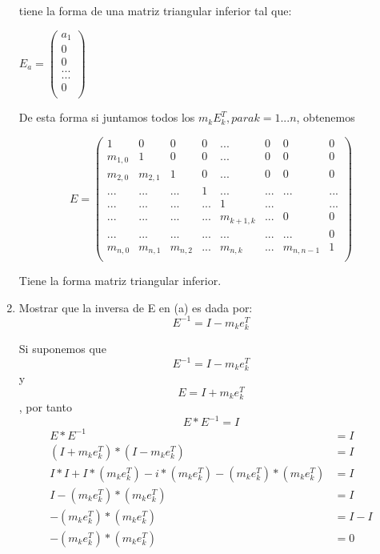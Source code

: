 \begin{enumerate}
        tiene la forma de una matriz triangular inferior tal que:
        
        \(
            E_{a} =
            \left( {\begin{array}{c}
                a_{1} \\
                0 \\
                0 \\
                ... \\
                ... \\
                0\\
            \end{array} } \right)
        \)
        
        De esta forma si juntamos todos los $m_{k}E_{k}^{T}, para k = 1 ... n$, obtenemos
    
        \[
        E =
            \left( {\begin{array}{cccccccc}
                1 & 0  & 0 & 0 & ... & 0 & 0 & 0\\
                m_{1,0} & 1  & 0 & 0 & ... & 0 & 0 & 0\\
                m_{2,0} & m_{2,1}  & 1 & 0 & ... & 0 & 0 & 0\\
                ... & ... & ... & 1 & ... & ... & ... & ...\\
                ... & ... & ... & ... & 1 & ... &  & ...\\
                ... & ...  & ... & ... & m_{k+1,k} & ... & 0 & 0\\
                ... & ...  & ... & ... & ... & ... & ... & 0\\
                m_{n,0} & m_{n,1}  & m_{n,2} & ... & m_{n,k} & ... & m_{n,n-1} & 1\\
            \end{array} } \right)
        \]
        
        Tiene la forma matriz triangular inferior.
        
    \item Mostrar que la inversa de  E en (a) es dada por:\\
    
        $$E^{-1} = I - m_{k}e_{k}^{T}$$
    
        Si suponemos que $$E^{-1} = I - m_{k}e_{k}^{T}$$ y $$E = I + m_{k}e_{k}^{T}$$, por tanto $$E * E^{-1} = I$$
        \begin{align*}
            E * E^{-1} &= I \\
            (I + m_{k}e_{k}^{T})*(I - m_{k}e_{k}^{T}) &= I\\
            I*I + I*(m_{k}e_{k}^{T}) - i*(m_{k}e_{k}^{T}) - (m_{k}e_{k}^{T}) *(m_{k}e_{k}^{T}) &= I\\
            I - (m_{k}e_{k}^{T}) *(m_{k}e_{k}^{T}) &= I\\
            - (m_{k}e_{k}^{T}) *(m_{k}e_{k}^{T}) &= I - I\\
            - (m_{k}e_{k}^{T}) *(m_{k}e_{k}^{T}) &= 0\\
        \end{align*}
\end{enumerate}





